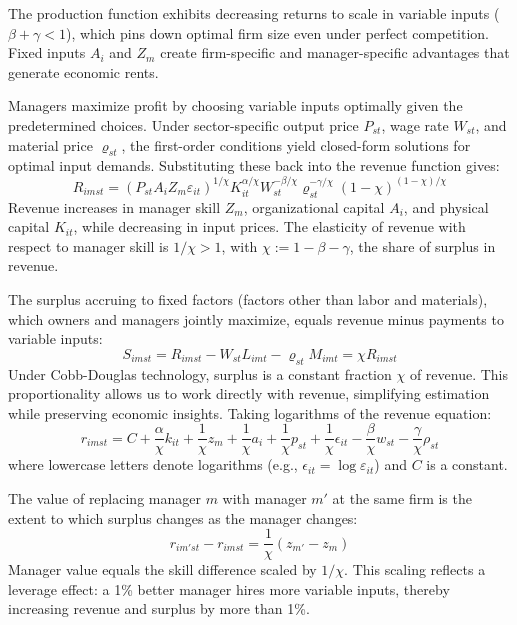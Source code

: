 \documentclass[11pt,a4paper]{article}
\begin{document}
The production function exhibits decreasing returns to scale in variable inputs ($\beta + \gamma < 1$), which pins down optimal firm size even under perfect competition. Fixed inputs $A_i$ and $Z_m$ create firm-specific and manager-specific advantages that generate economic rents.

Managers maximize profit by choosing variable inputs optimally given the predetermined choices. Under sector-specific output price $P_{st}$, wage rate $W_{st}$, and material price $\varrho_{st}$, the first-order conditions yield closed-form solutions for optimal input demands. Substituting these back into the revenue function gives:
\begin{equation}\label{eq:revenue}
R_{imst} = (P_{st}A_i Z_m \varepsilon_{it})^{1/\chi}
K_{it}^{\alpha/\chi}
W_{st}^{-\beta/\chi}
\varrho_{st}^{-\gamma/\chi}
(1-\chi)^{(1-\chi)/\chi}
\end{equation}
Revenue increases in manager skill $Z_m$, organizational capital $A_i$, and physical capital $K_{it}$, while decreasing in input prices. The elasticity of revenue with respect to manager skill is $1/\chi > 1$, with $\chi := 1 - \beta - \gamma$, the share of surplus in revenue. 

The surplus accruing to fixed factors (factors other than labor and materials), which owners and managers jointly maximize, equals revenue minus payments to variable inputs:
\begin{equation}\label{eq:surplus}
S_{imst} = R_{imst} - W_{st}L_{imt} - \varrho_{st}M_{imt} = \chi R_{imst}
\end{equation}
Under Cobb-Douglas technology, surplus is a constant fraction $\chi$ of revenue. This proportionality allows us to work directly with revenue, simplifying estimation while preserving economic insights. Taking logarithms of the revenue equation:
\begin{equation}\label{eq:log_revenue}
r_{imst} = C+\frac{\alpha}{\chi} k_{it} + \frac{1}{\chi} z_{m} + \frac{1}{\chi} a_i + \frac{1}{\chi} p_{st} + \frac{1}{\chi}\epsilon_{it} 
- \frac{\beta}{\chi} w_{st} - \frac{\gamma}{\chi} \rho_{st}
\end{equation}
where lowercase letters denote logarithms (e.g., $\epsilon_{it} = \log \varepsilon_{it}$) and $C$ is a constant.

The value of replacing manager $m$ with manager $m'$ at the same firm is the extent to which surplus changes as the manager changes:
\begin{equation}\label{eq:manager_value}
r_{im'st} - r_{imst} = \frac{1}{\chi}(z_{m'} - z_{m})
\end{equation}
Manager value equals the skill difference scaled by $1/\chi$. This scaling reflects a leverage effect: a 1\% better manager hires more variable inputs, thereby increasing revenue and surplus by more than 1\%.
\end{document}
